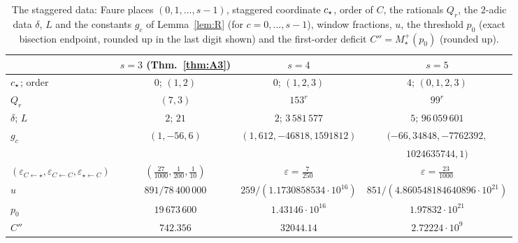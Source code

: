 \begin{table}[t]
\centering
\small
\caption{The staggered data: Faure places $(0,1,\dots,s-1)$, staggered coordinate $c_{\star}$, order of $C$, the rationals $Q_r$, the $2$-adic data $\delta$, $L$ and the constants $g_c$ of Lemma~\ref{lem:R} (for $c=0,\dots,s-1$), window fractions, $u$, the threshold $p_0$ (exact bisection endpoint, rounded up in the last digit shown) and the first-order deficit $C''=M_\star^+(p_0)$ (rounded up).}
\label{tab:BSdata}
\begin{tabular}{@{}lccc@{}}
\toprule
& $s=3$ (Thm.~\ref{thm:A3}) & $s=4$ & $s=5$\\
\midrule
$c_{\star}$; order & $0$; $(1,2)$ & $0$; $(1,2,3)$ & $4$; $(0,1,2,3)$\\
$Q_r$ & $(7,3)$ & $153^r$ & $99^r$\\
$\delta$; $L$ & $2$; $21$ & $2$; $3\,581\,577$ & $5$; $96\,059\,601$\\
$g_c$ & $(1,-56,6)$ & $(1,612,-46818,1591812)$ & $(-66,34848,-7762392,$\\
& & & $1024635744,1)$\\
$(\varepsilon_{C\leftarrow\star},\varepsilon_{C\leftarrow C},\varepsilon_{\star\leftarrow C})$ & $(\frac{27}{1000},\frac1{200},\frac1{10})$ & $\varepsilon=\frac7{250}$ & $\varepsilon=\frac{23}{1000}$\\
$u$ & $891/78\,400\,000$ & $259/(1.1730858534\cdot10^{16})$ & $851/(4.860548184640896\cdot10^{21})$\\
$p_0$ & $19\,673\,600$ & $1.43146\cdot10^{16}$ & $1.97832\cdot10^{21}$\\
$C''$ & $742.356$ & $32044.14$ & $2.72224\cdot10^9$\\
\bottomrule
\end{tabular}
\end{table}

